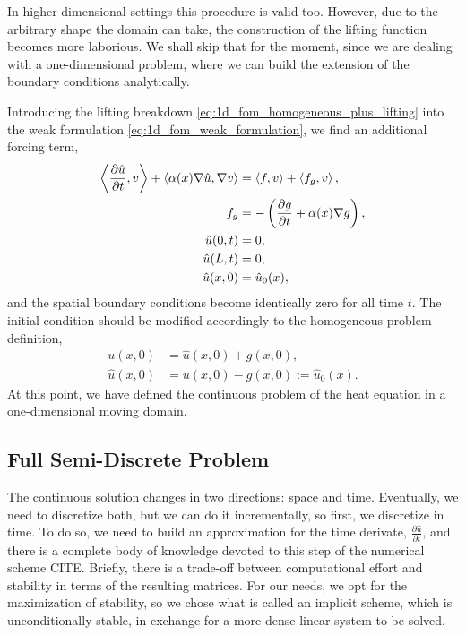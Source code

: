 \documentclass[../main.tex]{subfiles}
\newcommand{\inner}[2]{\left<#1, #2\right>}
\begin{document}
In higher dimensional settings this procedure is valid too. 
However, due to the arbitrary shape the domain can take, the construction of the lifting function becomes more laborious.
We shall skip that for the moment, since we are dealing with a one-dimensional problem, where we can build the extension of the boundary conditions analytically. 

Introducing the lifting breakdown \eqref{eq:1d_fom_homogeneous_plus_lifting} into the weak formulation \eqref{eq:1d_fom_weak_formulation},
we find an additional forcing term,
\begin{subequations}
    \label{eq:1d_fom_weak_formulation_homogeneous}
    \begin{align}
        \inner{\frac{\partial \hat{u}}{\partial t}}{v} + \inner{\alpha(x) \grad \hat{u}}{\grad v} &= \inner{f}{v} + \inner{f_g}{v}, \\
        f_g &= - \left(\frac{\partial g}{\partial t} + \alpha(x) \grad g\right), \\
        \hat{u}(0, t) &= 0, \\
        \hat{u}(L, t) &= 0, \\
        \hat{u}(x, 0) &= \hat{u}_0(x),
    \end{align}
\end{subequations}
and the spatial boundary conditions become identically zero for all time $t$.
The initial condition should be modified accordingly to the homogeneous problem definition, 
\begin{align}
    u(x,0) &= \hat{u}(x,0) + g(x,0), \nonumber \\ 
    \hat{u}(x,0) &= u(x,0) - g(x,0) := \hat{u}_0(x). 
\end{align}
At this point, we have defined the continuous problem of the heat equation in a one-dimensional moving domain. 

\subsection{Full Semi-Discrete Problem}
The continuous solution changes in two directions: space and time.
Eventually, we need to discretize both, but we can do it incrementally, so first, we discretize in time. 
To do so, we need to build an approximation for the time derivate, $\frac{\partial \hat{u}}{\partial t}$, and there is a complete body of knowledge devoted to this step of the numerical scheme CITE. 
Briefly, there is a trade-off between computational effort and stability in terms of the resulting matrices.
For our needs, we opt for the maximization of stability, so we chose what is called an implicit scheme, which is unconditionally stable, in exchange for a more dense linear system to be solved. 
\end{document}
